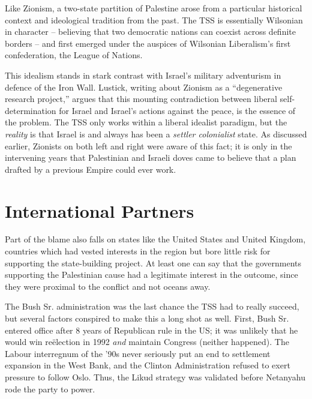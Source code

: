 \documentclass[letterpaper,12pt,twoside]{article} %
\begin{document}
\begin{multicols}{2}
Like Zionism, a two-state partition of Palestine arose from a particular historical context and ideological tradition from the past. The TSS is essentially Wilsonian in character -- believing that two democratic nations can coexist across definite borders -- and first emerged under the auspices of Wilsonian Liberalism's first confederation, the League of Nations. 

This idealism stands in stark contrast with Israel's military adventurism in defence of the Iron Wall. Lustick, writing about Zionism as a ``degenerative research project,'' argues that this mounting contradiction between liberal self-determination for Israel and Israel's actions against the peace, is the essence of the problem. The TSS only works within a liberal idealist paradigm, but the \textit{reality} is that Israel is and always has been a \textit{settler colonialist} state. As discussed earlier, Zionists on both left and right were aware of this fact; it is only in the intervening years that Palestinian and Israeli doves came to believe that a plan drafted by a previous Empire could ever work.

\section{International Partners}

Part of the blame also falls on states like the United States and United Kingdom, countries which had vested interests in the region but bore little risk for supporting the state-building project. At least one can say that the governments supporting the Palestinian cause had a legitimate interest in the outcome, since they were proximal to the conflict and not oceans away. 

The Bush Sr. administration was the last chance the TSS had to really succeed, but several factors conspired to make this a long shot as well. First, Bush Sr. entered office after 8 years of Republican rule in the US; it was unlikely that he would win reëlection in 1992 \textit{and} maintain Congress (neither happened). The Labour interregnum of the '90s never seriously put an end to settlement expansion in the West Bank, and the Clinton Administration refused to exert pressure to follow Oslo. Thus, the Likud strategy was validated before Netanyahu rode the party to power.


\end{multicols}
\end{document}
